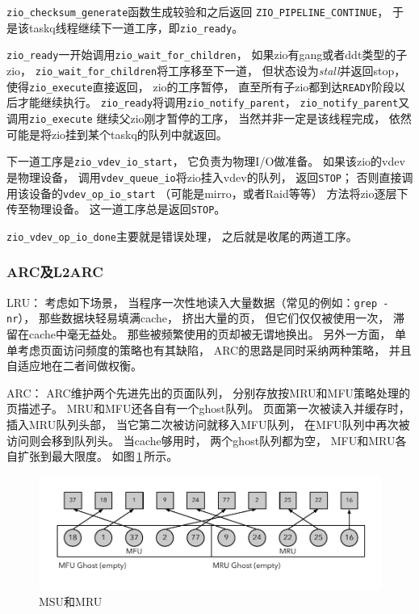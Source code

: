 \verb|zio_checksum_generate|函数生成较验和之后返回
\verb|ZIO_PIPELINE_CONTINUE|，
于是该taskq线程继续下一道工序，即\verb|zio_ready|。

\verb|zio_ready|一开始调用\verb|zio_wait_for_children|，
如果zio有gang或者ddt类型的子zio，
\verb|zio_wait_for_children|将工序移至下一道，
但状态设为{\em stall}并返回stop，
使得\verb|zio_execute|直接返回，
zio的工序暂停，
直至所有子zio都到达\verb|READY|阶段以后才能继续执行。
\verb|zio_ready|将调用\verb|zio_notify_parent|，
\verb|zio_notify_parent|又调用\verb|zio_execute|%
继续父zio刚才暂停的工序，
当然并非一定是该线程完成，
依然可能是将zio挂到某个taskq的队列中就返回。

下一道工序是\verb|zio_vdev_io_start|，
它负责为物理I/O做准备。
如果该zio的vdev是物理设备，
调用\verb|vdev_queue_io|将zio挂入vdev的队列，
返回\verb|STOP|；
否则直接调用该设备的\verb|vdev_op_io_start|%
（可能是mirro，或者Raid等等）
方法将zio逐层下传至物理设备。
这一道工序总是返回\verb|STOP|。

\verb|zio_vdev_op_io_done|主要就是错误处理，
之后就是收尾的两道工序。

\subsubsection{ARC及L2ARC}
LRU：
考虑如下场景，
当程序一次性地读入大量数据（常见的例如：\verb|grep -nr|），
那些数据块轻易填满cache，
挤出大量的页，
但它们仅仅被使用一次，
滞留在cache中毫无益处。
那些被频繁使用的页却被无谓地换出。
另外一方面，
单单考虑页面访问频度的策略也有其缺陷，
ARC的思路是同时采纳两种策略，
并且自适应地在二者间做权衡。

ARC：
ARC维护两个先进先出的页面队列，
分别存放按MRU和MFU策略处理的页描述子。
MRU和MFU还各自有一个ghost队列。
页面第一次被读入并缓存时，
插入MRU队列头部，
当它第二次被访问就移入MFU队列，
在MFU队列中再次被访问则会移到队列头。
当cache够用时，
两个ghost队列都为空，
MFU和MRU各自扩张到最大限度。
如图\,\ref{fig:zfs_arc0}\,所示。

\begin{figure}[!h]
  \centering
  \includegraphics[width=\textwidth]{fig/zfs_arc0.pdf}
  \caption{MSU和MRU}\label{fig:zfs_arc0}
\end{figure}

